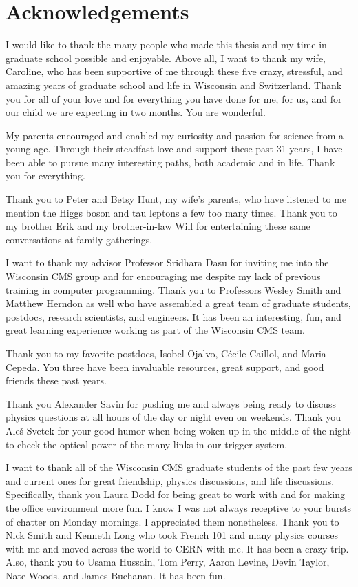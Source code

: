 \section{Acknowledgements}
I would like to thank the many people who made this thesis and my time in graduate school possible and enjoyable. 
Above all, I want to thank my wife, Caroline, who has been supportive of me through these five crazy, stressful, 
and amazing years of graduate school and life in Wisconsin and Switzerland. Thank you for all of your love 
and for everything you have done for me, for us, and for our child we are expecting in two months. You are wonderful.

My parents encouraged and enabled my curiosity and passion for science from a young age. Through their steadfast 
love and support these past 31 years, I have been able to pursue many interesting paths, both academic and 
in life. Thank you for everything.

Thank you to Peter and Betsy Hunt, my wife's parents, who have listened to 
me mention the Higgs boson and tau leptons a few too many times. Thank you to my brother Erik and my 
brother-in-law Will for entertaining these same conversations at family gatherings.

I want to thank my advisor Professor Sridhara Dasu for inviting me into the Wisconsin CMS group and for 
encouraging me despite my lack of previous training in computer programming. Thank you to Professors Wesley 
Smith and Matthew Herndon as well who have assembled a great team of graduate students, postdocs, research 
scientists, and engineers. It has been an interesting, fun, and great learning experience working as
part of the Wisconsin CMS team.

Thank you to my favorite postdocs, Isobel Ojalvo, C\'{e}cile Caillol, and Maria Cepeda. You three have been 
invaluable resources, great support, and good friends these past years.

Thank you Alexander Savin for pushing me and always being ready to discuss physics questions at all hours 
of the day or night even on weekends. Thank you Ale\v{s} Svetek for your good humor when being woken 
up in the middle of the night to check the optical power of the many links in our trigger system.

I want to thank all of the Wisconsin CMS graduate students of the past few years and current ones for great 
friendship, physics discussions, and life discussions. Specifically, thank you Laura Dodd for being great 
to work with and for making the office environment more fun. I know I was not always receptive to your 
bursts of chatter on Monday mornings. I appreciated them nonetheless. Thank you to Nick Smith and Kenneth 
Long who took French 101 and many physics courses with me and moved across the world to CERN with me. It 
has been a crazy trip. Also, thank you to Usama Hussain, Tom Perry, Aaron Levine, Devin Taylor, 
Nate Woods, and James Buchanan. It has been fun.


